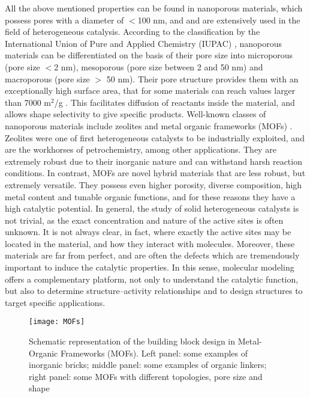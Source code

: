 \npar
All the above mentioned properties can be found in nanoporous materials, which possess pores with a diameter of $<$100 nm, and and are extensively used in the field of heterogeneous catalysis. According to the classification by the International Union of Pure and Applied Chemistry (IUPAC) \cite{mcnaught1997compendium}, nanoporous materials can be differentiated on the basis of their pore size into microporous (pore size $<$2 nm), mesoporous (pore size between 2 and 50 nm) and macroporous (pore size $>$ 50 nm). Their pore structure provides them with an exceptionally high surface area, that for some materials can reach values larger than 7000 m$^2$/g \cite{farha2012metal, honicke2018balancing}. This facilitates diffusion of reactants inside the material, and allows shape selectivity to give specific products. Well-known classes of nanoporous materials include zeolites and metal organic frameworks (MOFs) \cite{liang2017heterogeneous}. Zeolites were one of first heterogeneous catalysts to be industrially exploited, and are the workhorses of petrochemistry, among other applications. They are extremely robust due to their inorganic nature and can withstand harsh reaction conditions. In contrast, MOFs are novel hybrid materials that are less robust, but extremely versatile. They possess even higher porosity, diverse composition, high metal content and tunable organic functions, and for these reasons they have a high catalytic potential. 
\npar
In general, the study of solid heterogeneous catalysts is not trivial, as the exact concentration and nature of the active sites is often unknown. It is not always clear, in fact, where exactly the active sites may be located in the material, and how they interact with molecules. Moreover, these materials are far from perfect, and are often the defects which are tremendously important to induce the catalytic properties. In this sense, molecular modeling offers a complementary platform, not only to understand the catalytic function, but also to determine structure--activity relationships and to design structures to target specific applications\cite{van2015advances}. 

\begin{figure}[!htbp]
	\centering
 	\texttt{[image: MOFs]}
	\caption{Schematic representation of the building block design in Metal-Organic Frameworks (MOFs). Left panel: some examples of inorganic bricks; middle panel: some examples of organic linkers; right panel: some MOFs with different topologies, pore size and shape}
	\label{fig:MOFs}
\end{figure}


